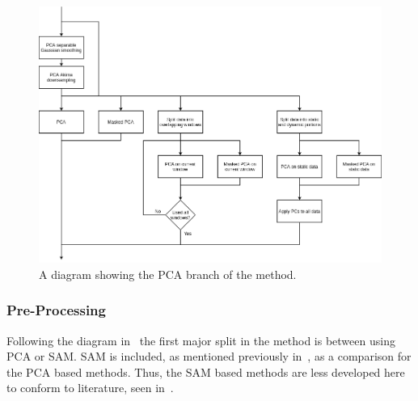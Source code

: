                 \begin{figure}
                    \centering
                    
                    \includegraphics[width=1.0\linewidth]{figures/pca_data_driven_surrogate_signal_extraction_methods_for_dynamic_pet_methods_data_driven_surrogate_signal_extraction_pca.png}
                    
                    \captionsetup{singlelinecheck=false, justification=centering}
                    \caption{A diagram showing the \gls{PCA} branch of the method.}
                    \label{fig:pca_data_driven_surrogate_signal_extraction_methods_for_dynamic_pet_methods_data_driven_surrogate_signal_extraction_pca}
                \end{figure}
                
                \subsubsection{Pre-Processing} \label{sec:pca_data_driven_surrogate_signal_extraction_methods_for_dynamic_pet_methods_pre_processing}
                    Following the diagram in~ the first major split in the method is between using \gls{PCA} or \gls{SAM}. \gls{SAM} is included, as mentioned previously in~, as a comparison for the \gls{PCA} based methods. Thus, the \gls{SAM} based methods are less developed here to conform to literature, seen in~.
                    
